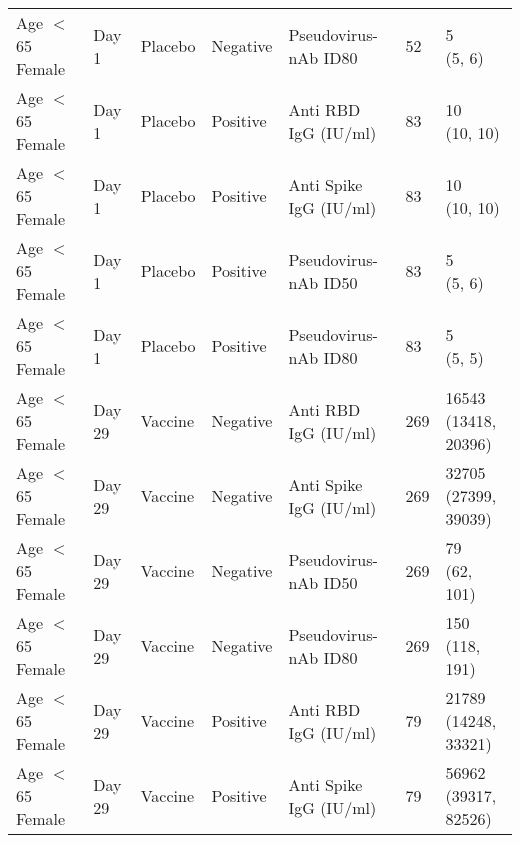 \documentclass[]{book}
\theoremstyle{definition}
\theoremstyle{definition}
\theoremstyle{definition}
\newcommand{\1}{\mathbbm{1}}
\begin{document}
\begin{landscape}
\begin{ThreePartTable}
\begin{longtable}[t]{>{\raggedright\arraybackslash}p{7cm}llllll}
\hspace{1em}Age $<$ 65 Female & Day 1 & Placebo & Negative & Pseudovirus-nAb ID80 & 52 & \makecell[l]{5\\(5, 6)}\\
\hspace{1em}Age $<$ 65 Female & Day 1 & Placebo & Positive & Anti RBD IgG (IU/ml) & 83 & \makecell[l]{10\\(10, 10)}\\
\hspace{1em}Age $<$ 65 Female & Day 1 & Placebo & Positive & Anti Spike IgG (IU/ml) & 83 & \makecell[l]{10\\(10, 10)}\\
\hspace{1em}Age $<$ 65 Female & Day 1 & Placebo & Positive & Pseudovirus-nAb ID50 & 83 & \makecell[l]{5\\(5, 6)}\\
\hspace{1em}Age $<$ 65 Female & Day 1 & Placebo & Positive & Pseudovirus-nAb ID80 & 83 & \makecell[l]{5\\(5, 5)}\\
\hspace{1em}Age $<$ 65 Female & Day 29 & Vaccine & Negative & Anti RBD IgG (IU/ml) & 269 & \makecell[l]{16543\\(13418, 20396)}\\
\hspace{1em}Age $<$ 65 Female & Day 29 & Vaccine & Negative & Anti Spike IgG (IU/ml) & 269 & \makecell[l]{32705\\(27399, 39039)}\\
\hspace{1em}Age $<$ 65 Female & Day 29 & Vaccine & Negative & Pseudovirus-nAb ID50 & 269 & \makecell[l]{79\\(62, 101)}\\
\hspace{1em}Age $<$ 65 Female & Day 29 & Vaccine & Negative & Pseudovirus-nAb ID80 & 269 & \makecell[l]{150\\(118, 191)}\\
\hspace{1em}Age $<$ 65 Female & Day 29 & Vaccine & Positive & Anti RBD IgG (IU/ml) & 79 & \makecell[l]{21789\\(14248, 33321)}\\
\hspace{1em}Age $<$ 65 Female & Day 29 & Vaccine & Positive & Anti Spike IgG (IU/ml) & 79 & \makecell[l]{56962\\(39317, 82526)}\\

\end{longtable}
\end{ThreePartTable}
\end{landscape}
\end{document}
